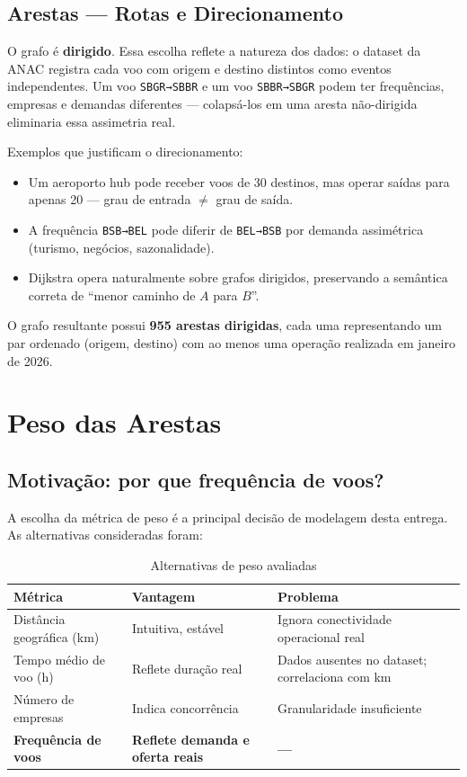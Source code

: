 \documentclass[12pt,a4paper]{article}
\begin{document}
\subsection{Arestas --- Rotas e Direcionamento}

O grafo é \textbf{dirigido}. Essa escolha reflete a natureza dos dados: o dataset da ANAC registra
cada voo com origem e destino distintos como eventos independentes. Um voo \texttt{SBGR→SBBR} e um voo
\texttt{SBBR→SBGR} podem ter frequências, empresas e demandas diferentes --- colapsá-los em uma aresta
não-dirigida eliminaria essa assimetria real.

Exemplos que justificam o direcionamento:
\begin{itemize}
    \item Um aeroporto hub pode receber voos de 30 destinos, mas operar saídas para apenas 20 --- grau
          de entrada $\neq$ grau de saída.
    \item A frequência \texttt{BSB→BEL} pode diferir de \texttt{BEL→BSB} por demanda assimétrica
          (turismo, negócios, sazonalidade).
    \item Dijkstra opera naturalmente sobre grafos dirigidos, preservando a semântica
          correta de ``menor caminho de $A$ para $B$''.
\end{itemize}

O grafo resultante possui \textbf{955 arestas dirigidas}, cada uma representando um par ordenado
(origem, destino) com ao menos uma operação realizada em janeiro de 2026.

\section{Peso das Arestas}

\subsection{Motivação: por que frequência de voos?}

A escolha da métrica de peso é a principal decisão de modelagem desta entrega. As alternativas
consideradas foram:

\begin{table}[H]
\centering
\caption{Alternativas de peso avaliadas}
\begin{tabularx}{\textwidth}{lXX}
\toprule
\textbf{Métrica} & \textbf{Vantagem} & \textbf{Problema} \\
\midrule
Distância geográfica (km) & Intuitiva, estável & Ignora conectividade operacional real \\[4pt]
Tempo médio de voo (h)    & Reflete duração real & Dados ausentes no dataset; correlaciona com km \\[4pt]
Número de empresas        & Indica concorrência & Granularidade insuficiente \\[4pt]
\textbf{Frequência de voos} & \textbf{Reflete demanda e oferta reais} & \textbf{---} \\
\bottomrule
\end{tabularx}
\end{table}
\end{document}
